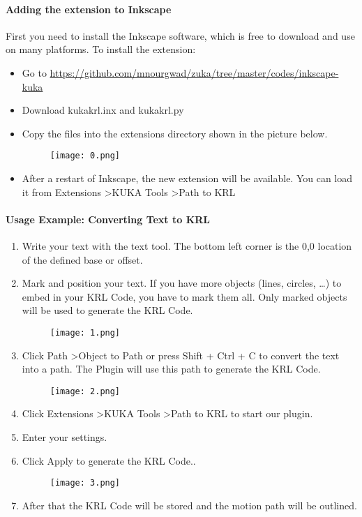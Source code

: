 \paragraph{Adding the extension to Inkscape}
First you need to install the Inkscape software, which is free to download and use on many platforms.
To install the extension:
\begin{itemize}
	\item Go to \url{https://github.com/mnourgwad/zuka/tree/master/codes/inkscape-kuka}
	\item Download kukakrl.inx and kukakrl.py
	\item Copy the files into the extensions directory shown in the picture below.\
	\begin{figure}[H]
		\centering
		\texttt{[image: 0.png]}
	\end{figure}
\item After a restart of Inkscape, the new extension will be available.
You can load it from Extensions \textgreater KUKA Tools \textgreater Path to KRL

\end{itemize}
\paragraph{Usage Example: Converting Text to KRL}
	
\begin{enumerate}
	\item Write your text with the text tool. The bottom left corner is the 0,0 location of the defined base or offset.
	\item Mark and position your text. If you have more objects (lines, circles, …) to embed in your KRL Code, you have to mark them all. Only marked objects will be used to generate the KRL Code.
		\begin{figure}[H]
		\centering
		\texttt{[image: 1.png]}
	\end{figure}
	\item Click Path \textgreater Object to Path or press Shift + Ctrl + C to convert the text into a path. The Plugin will use this path to generate the KRL Code.
	\begin{figure}[H]
		\centering
		\texttt{[image: 2.png]}
	\end{figure}
	\item Click Extensions \textgreater KUKA Tools \textgreater Path to KRL to start our plugin.
	\item Enter your settings.
	\item Click Apply to generate the KRL Code..
		\begin{figure}[H]
	\centering
		\texttt{[image: 3.png]}
		\end{figure}
   \item After that the KRL Code will be stored and the motion path will be outlined.
   
\end{enumerate}


